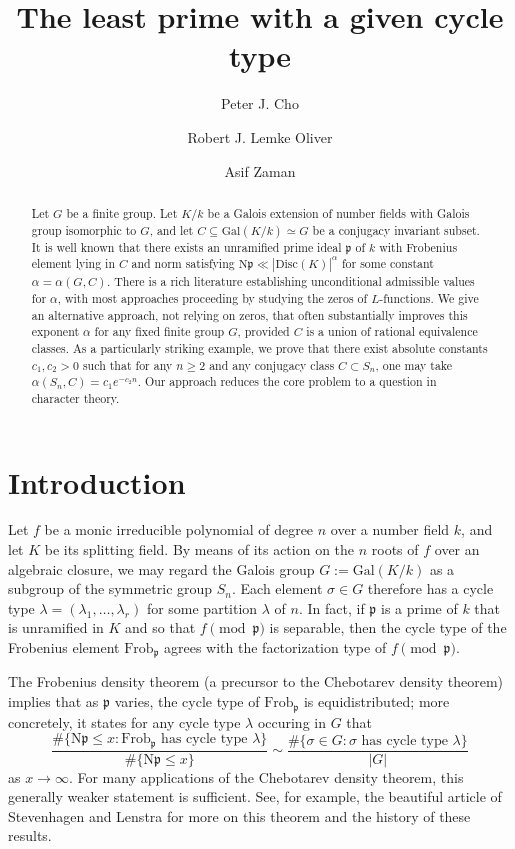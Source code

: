 \documentclass[12pt]{amsart}
\title{The least prime with a given cycle type}
\author{Peter J. Cho}
\author{Robert J. Lemke Oliver}
\author{Asif Zaman}
\theoremstyle{definition} \newtheorem{definition}[theorem]{Definition}
\theoremstyle{example} \newtheorem{example}[theorem]{Example}
\theoremstyle{remark} \newtheorem{remark}{Remark}[theorem]
\numberwithin{equation}{section}
\numberwithin{theorem}{section}
\renewcommand{\leq}{\leqslant}
\renewcommand{\geq}{\geqslant}
\newcommand{\N}{\mathrm{N}} %
\newcommand{\kp}{\mathfrak{p}}
\begin{document}
	\begin{abstract}
		Let $G$ be a finite group. Let $K/k$ be a Galois extension of number fields with Galois group isomorphic to $G$, and let $C \subseteq \mathrm{Gal}(K/k) \simeq G$ be a conjugacy invariant subset.  It is well known that there exists an unramified prime ideal $\mathfrak{p}$ of $k$ with Frobenius element lying in $C$ and norm satisfying $\N\kp \ll |\mathrm{Disc}(K)|^{\alpha}$ for some constant $\alpha = \alpha(G,C)$. There is a rich literature establishing unconditional admissible values for $\alpha$, with most approaches proceeding by studying the zeros of $L$-functions. We give an alternative approach, not relying on zeros, that often substantially improves this exponent $\alpha$ for any fixed finite group $G$, provided $C$ is a union of rational equivalence classes. 
		As a particularly striking example, we prove that there exist absolute constants $c_1,c_2 > 0$ such that for any $n\geq 2$ and any conjugacy class $C \subset S_n$, one may take $\alpha(S_n,C) = c_1 e^{-c_2n}$. Our approach reduces the core problem to a question in character theory. 
	\end{abstract}
	
	\maketitle
	
	

\section{Introduction}

	Let $f$ be a monic irreducible polynomial of degree $n$ over a number field $k$, and let $K$ be its splitting field.  By means of its action on the $n$ roots of $f$ over an algebraic closure, we may regard the Galois group $G:=\mathrm{Gal}(K/k)$ as a subgroup of the symmetric group $S_n$.  Each element $\sigma \in G$ therefore has a cycle type $\lambda = (\lambda_1,\dots,\lambda_r)$ for some partition $\lambda$ of $n$.  In fact, if $\mathfrak{p}$ is a prime of $k$ that is unramified in $K$ and so that $f \pmod{\mathfrak{p}}$ is separable, then the cycle type of the Frobenius element $\mathrm{Frob}_\mathfrak{p}$ agrees with the factorization type of $f \pmod{\mathfrak{p}}$.
	
	The Frobenius density theorem (a precursor to the Chebotarev density theorem) implies that as $\mathfrak{p}$ varies, the cycle type of $\mathrm{Frob}_\mathfrak{p}$ is equidistributed; more concretely, it states for any cycle type $\lambda$ occuring in $G$ that
		\[
			\frac{ \#\{ \N\mathfrak{p}  \leq x : \mathrm{Frob}_\mathfrak{p} \text{ has cycle type $\lambda$}\}}{ \#\{\N\mathfrak{p} \leq x\}}
				\sim \frac{\#\{\sigma \in G : \sigma \text{ has cycle type $\lambda$}\}}{|G|}
		\]
	as $x \to \infty$.  For many applications of the Chebotarev density theorem, this generally weaker statement is sufficient.  See, for example, the beautiful article of Stevenhagen and Lenstra \cite{LenstraStevenhagen-Chebotarev} for more on this theorem and the history of these results.
	
\end{document}
